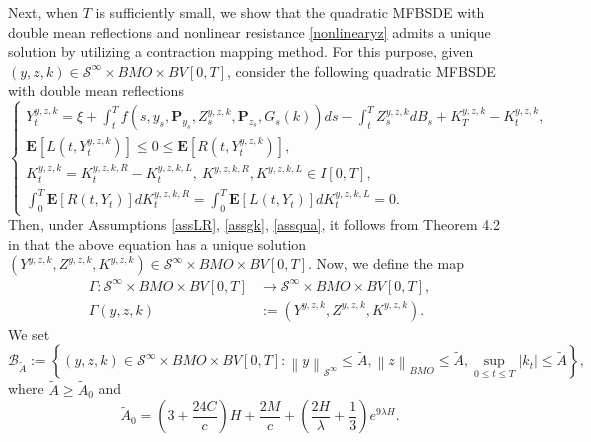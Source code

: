 \documentclass[10pt]{article}%
\numberwithin{equation}{section}
\def \E{\mathbf{E}}
\def \P{\mathbf{P}}
\begin{document}
Next, when $T$ is sufficiently small, we show that the quadratic MFBSDE with double mean reflections and nonlinear resistance \eqref{nonlinearyz} admits a unique solution  by utilizing a contraction mapping method. For this purpose, given $
\left(y, z, k\right)\in \mathcal{S}^{\infty} \times BMO\times BV[0,T]$, consider the following quadratic MFBSDE with double mean reflections  %
\begin{equation}\label{nonlinearyz-1}
\begin{cases}
Y_t^{y,z,k}=\xi+\int_t^T f(s,y_s,\P_{y_s},Z_s^{y,z,k},\P_{z_s},G_s(k))ds-\int_t^T Z_s^{y,z,k} dB_s+K_T^{y,z,k}-K_t^{y,z,k},\\
\E[L(t,Y_t^{y,z,k})]\leq 0\leq \E[R(t,Y_t^{y,z,k})], \\
K_t^{y,z,k}=K^{y,z,k,R}_t-K^{y,z,k,L}_t,\ K^{y,z,k,R},K^{y,z,k,L}\in I[0,T],\\
\int_0^T \E[R(t,Y_t)]dK^{y,z,k,R}_t=\int_0^T \E[L(t,Y_t)]dK^{y,z,k,L}_t=0.
\end{cases}
\end{equation}  
Then, under Assumptions \ref{assLR}, \ref{assgk}, \ref{assqua}, it follows from Theorem 4.2 in \cite{LS} that the above equation has a unique solution $\left(Y^{y,z,k}, Z^{y,z,k}, K^{y,z,k}\right)\in \mathcal{S}^{\infty} \times BMO\times BV[0,T]$.     
Now, we define the map 
\begin{align*}
\Gamma:\mathcal{S}^{\infty} \times BMO\times BV[0,T]&\rightarrow \mathcal{S}^{\infty} \times BMO \times BV[0,T],  \\
\Gamma\left(y,z,k\right)&:=\left(Y^{y,z,k}, Z^{y,z,k}, K^{y,z,k}\right).
\end{align*}
We set 
\begin{equation}\label{BA}
    \mathscr{B}_{\tilde{A}} := \left\{ \left(y, z, k\right)\in \mathcal{S}^{\infty} \times BMO \times BV[0,T]:\left \| y \right \|_{\mathcal{S}^{\infty}}\leq \tilde{A},  \left \| z \right \|_{BMO}\leq \tilde{A}, \sup_{0 \leq t \leq T}\left|k_t\right|\leq \tilde{A}\right\},
\end{equation}
where $\tilde{A} \geq \tilde{A}_0$ and
\begin{equation}\label{A0}
 \tilde{A}_0=(3+\frac{24C}{c})H+\frac{2M}{c}+(\frac{2H}{\lambda}+\frac{1}{3})e^{9\lambda H}.   
\end{equation}
\end{document}

